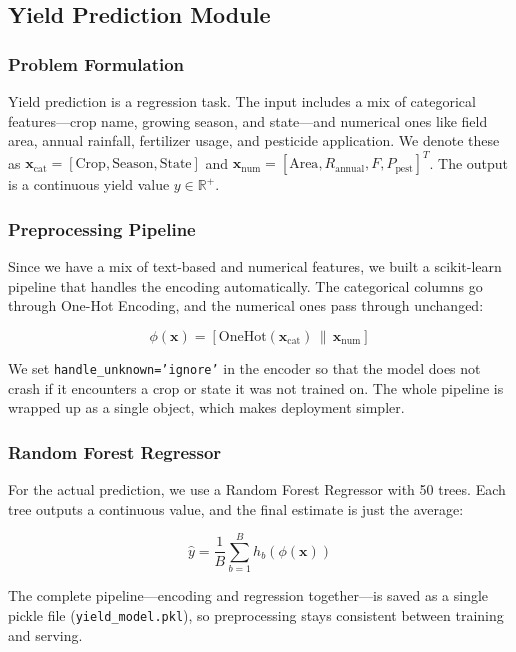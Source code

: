 \documentclass[conference]{IEEEtran}
\begin{document}
\subsection{Yield Prediction Module}

\subsubsection{Problem Formulation}
Yield prediction is a regression task. The input includes a mix of categorical features---crop name, growing season, and state---and numerical ones like field area, annual rainfall, fertilizer usage, and pesticide application. We denote these as $\mathbf{x}_{\text{cat}} = [\text{Crop}, \text{Season}, \text{State}]$ and $\mathbf{x}_{\text{num}} = [\text{Area}, R_{\text{annual}}, F, P_{\text{pest}}]^T$.  The output is a continuous yield value $y \in \mathbb{R}^+$.

\subsubsection{Preprocessing Pipeline}
Since we have a mix of text-based and numerical features, we built a scikit-learn pipeline that handles the encoding automatically. The categorical columns go through One-Hot Encoding, and the numerical ones pass through unchanged:

\begin{equation}
\phi(\mathbf{x}) = [\text{OneHot}(\mathbf{x}_{\text{cat}}) \,\|\, \mathbf{x}_{\text{num}}]
\end{equation}

We set \texttt{handle\_unknown='ignore'} in the encoder so that the model does not crash if it encounters a crop or state it was not trained on. The whole pipeline is wrapped up as a single object, which makes deployment simpler.

\subsubsection{Random Forest Regressor}
For the actual prediction, we use a Random Forest Regressor with 50 trees. Each tree outputs a continuous value, and the final estimate is just the average:

\begin{equation}
\hat{y} = \frac{1}{B} \sum_{b=1}^{B} h_b(\phi(\mathbf{x}))
\label{eq:rf_regression}
\end{equation}

The complete pipeline---encoding and regression together---is saved as a single pickle file (\texttt{yield\_model.pkl}), so preprocessing stays consistent between training and serving.
\end{document}
